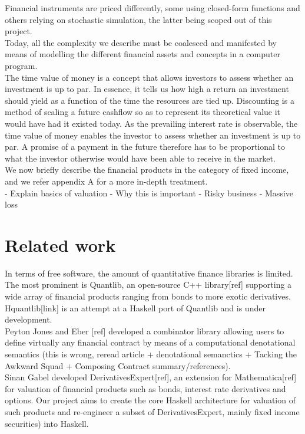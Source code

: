 Financial instruments are priced differently, some using closed-form functions 
and others relying on stochastic simulation, the latter being scoped out of 
this project.\\




Today, all the complexity we describe must be coalesced and manifested by means
of modelling the different financial assets and concepts in a computer program.\\

The time value of money is a concept that allows investors to assess whether an 
investment is up to par. In essence, it tells us how high a return an 
investment should yield as a function of the time the resources are tied up.
Discounting is a method of scaling a future cashflow so as to represent its 
theoretical value it would have had it existed today.
As the prevailing interest rate is observable, the time value of money enables 
the investor to assess whether an investment is up to par. A promise of a 
payment in the future therefore has to be proportional to what the investor 
otherwise would have been able to receive in the market.\\

We now briefly describe the financial products in the category of fixed income, 
and we refer appendix A for a more in-depth treatment.\\

- Explain basics of valuation
- Why this is important
	- Risky business
	- Massive loss


\section{Related work}

In terms of free software, the amount of quantitative finance libraries is 
limited.
The most prominent is Quantlib, an open-source C++ library[ref] supporting a 
wide array of financial products ranging from bonds to more exotic derivatives.\\

Hquantlib[link] is an attempt at a Haskell port of Quantlib and is under 
development.\\

Peyton Jones and Eber [ref] developed a combinator library allowing users to 
define virtually any financial contract by means of a computational 
denotational semantics (this is wrong, reread article + denotational semanctics 
+ Tacking the Awkward Squad + Composing Contract summary/references).\\

Sinan Gabel developed DerivativesExpert[ref], an extension for Mathematica[ref] 
for valuation of financial products such as bonds, interest rate derivatives 
and options. Our project aims to create the core Haskell architecture for 
valuation of such products and re-engineer a subset of DerivativesExpert, 
mainly fixed income securities) into Haskell.
